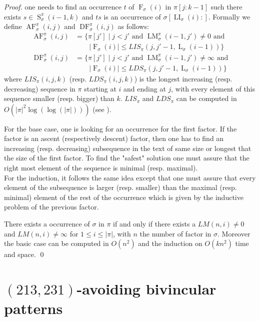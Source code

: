 \documentclass[a4paper]{llncs}
\newcommand{\ptext}{\pi}
\newcommand{\pmotif}{\sigma}
\newcounter{num}
\DeclareMathOperator{\firsta}{L}
\newcommand{\first}[2]{\firsta_{{#1}}({#2})}
\DeclareMathOperator{\firstia}{LI}
\newcommand{\firsti}[2]{\firstia_{{#1}}({#2})}
\DeclareMathOperator{\factora}{F}
\newcommand{\factor}[2]{\factora_{{#1}}({#2})}
\DeclareMathOperator{\LMa}{LM}
\newcommand{\LM}[4]{\LMa_{{#1}}^{{#2}}(#3,#4)}
\DeclareMathOperator{\AFa}{AF}
\newcommand{\AF}[4]{\AFa_{{#1}}^{{#2}}(#3,#4)}
\DeclareMathOperator{\DFa}{DF}
\newcommand{\DF}[4]{\DFa_{{#1}}^{{#2}}(#3,#4)}
\DeclareMathOperator{\SETa}{S}
\newcommand{\SET}[4]{\SETa_{{#1}}^{{#2}}({#3},{#4})}
\begin{document}
\begin{proof}
one needs to find an occurrence $t$ of $\factor{\pmotif}{i}$ in $\ptext[j:k-1]$ 
such there exists $s \in \SET{\pmotif}{\ptext}{i-1}{k}$ and $ts$ is an occurrence of 
$\pmotif[\firsti{\pmotif}{i}:]$. 
Formally we define $\AF{\pmotif}{\ptext}{i}{j}$ and $\DF{\pmotif}{\ptext}{i}{j}$ as follows:
\begin{align*}
\AF{\pmotif}{\ptext}{i}{j}
&=
\text{$\{\ptext[j'] \;|\; j<j'$ and $\LM{\pmotif}{\ptext}{i-1}{j'} \neq 0$ and} 
\\
&\qquad 
\text{$|\factor{\pmotif}{i}| \leq LIS_{\ptext}(j,j'-1,\first{\pmotif}{i-1})\}$} 
\\
\DF{\pmotif}{\ptext}{i}{j}
&=
\text{$\{\ptext[j'] \;|\; j<j'$ and $\LM{\pmotif}{\ptext}{i-1}{j'} \neq \infty$ and}
\\
&\qquad
\text{$|\factor{\pmotif}{i}| \leq LDS_{\ptext}(j,j'-1,\first{\pmotif}{i-1})\}$}
\end{align*}
where $LIS_{\ptext}(i,j,k)$ (resp. $LDS_{\ptext}(i,j,k)$) is the longest increasing 
(resp. decreasing) sequence in $\ptext$ starting at $i$ and ending at $j$,
with every element of this sequence
smaller (resp. bigger) than $k$.
$LIS_{\ptext}$ and $LDS_{\ptext}$ can be computed in 
$O(|\ptext|^2\log(\log(|\ptext|)))$ (see \cite{Bespamyatnikh00enumeratinglongest}).

For the base case,
one is looking for an occurrence for the first factor.
If the factor is an ascent (respectively descent) factor, then
one has to find an increasing (resp. decreasing) subsequence
in the text of same size or longest that
the size of the first factor.
To find the "safest" solution
one must assure that the right most element
of the sequence is minimal (resp. maximal).\\
For the induction, it follows the same idea
except that one must assure that
every element of the subsequence is larger (resp. smaller)
than the maximal (resp. minimal) element of the rest of the occurrence which is given by the inductive problem of
the previous factor.

There exists a occurrence of $\pmotif$ in $\ptext$ if and only if
there exists a $LM(n,i)\neq 0$ and $LM(n,i)\neq \infty$ for $1 \leq i \leq |\ptext|$,
with $n$ the number of factor in $\pmotif$.
Moreover the basic case can be computed in $O(n^2)$
and the induction on $O(kn^2)$ time and space.
\qed
\end{proof}


\section{$(213,231)$-avoiding bivincular patterns}
	\label{section:bivincular}
\end{document}
